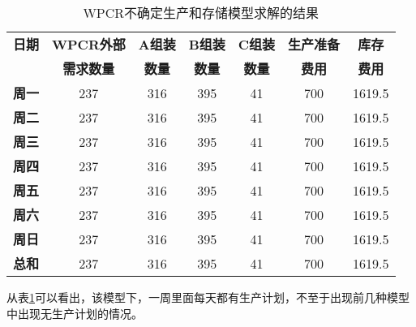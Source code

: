 \begin{table}[H]
    \caption{WPCR不确定生产和存储模型求解的结果}
    \label{T.ch5-1}
    \centering
    \renewcommand\arraystretch{1.5} 
    \begin{tabular}{@{}ccccccc@{}} 
    \toprule
    \textbf{日期} & \multicolumn{1}{c}{\textbf{WPCR外部}} & \multicolumn{1}{c}{\textbf{A组装}} 
    & \multicolumn{1}{c}{\textbf{B组装}} & \multicolumn{1}{c}{\textbf{C组装}}
    & \multicolumn{1}{c}{\textbf{生产准备}} & \multicolumn{1}{c}{\textbf{库存}} \\
                & \multicolumn{1}{c}{\textbf{需求数量}} & \multicolumn{1}{c}{\textbf{数量}} 
    & \multicolumn{1}{c}{\textbf{数量}} & \multicolumn{1}{c}{\textbf{数量}}
    & \multicolumn{1}{c}{\textbf{费用}} & \multicolumn{1}{c}{\textbf{费用}} \\
    \midrule
    \textbf{周一} & 237 & 316 & 395 & 41 & 700 & 1619.5 \\
    \textbf{周二} & 237 & 316 & 395 & 41 & 700 & 1619.5 \\
    \textbf{周三} & 237 & 316 & 395 & 41 & 700 & 1619.5 \\
    \textbf{周四} & 237 & 316 & 395 & 41 & 700 & 1619.5 \\
    \textbf{周五} & 237 & 316 & 395 & 41 & 700 & 1619.5 \\
    \textbf{周六} & 237 & 316 & 395 & 41 & 700 & 1619.5 \\
    \textbf{周日} & 237 & 316 & 395 & 41 & 700 & 1619.5 \\
    \textbf{总和} & 237 & 316 & 395 & 41 & 700 & 1619.5 \\ 
    \bottomrule
    \end{tabular}
\end{table}

从表\ref{T.ch5-1}可以看出，该模型下，一周里面每天都有生产计划，不至于出现前几种模型中出现无生产计划的情况。